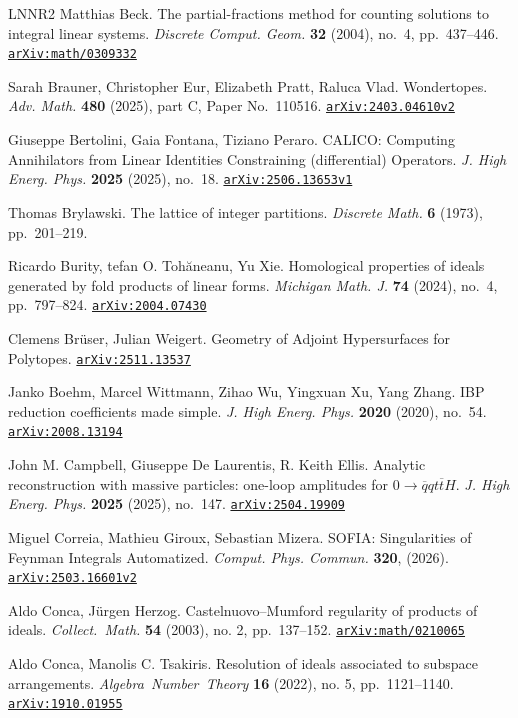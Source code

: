 \documentclass [a4paper,reqno, 11pt]{amsart}
\theoremstyle{plain}
\theoremstyle{plain}
\theoremstyle{plain}
\theoremstyle{plain}
\theoremstyle{definition}
\theoremstyle{definition}
\theoremstyle{definition}
\theoremstyle{definition}
\theoremstyle{definition}
\theoremstyle{definition}
\newcommand{\arxiv}[1]{\href{http://arxiv.org/abs/#1}{{\tt arXiv:#1}}}
\begin{document}
\begin{thebibliography}{LNNR2}
Matthias Beck. The partial-fractions method for counting solutions to integral linear systems. \textit{Discrete Comput. Geom.} \textbf{32} (2004), no.~4, pp.~437--446. \arxiv{math/0309332}

Sarah Brauner, Christopher Eur, Elizabeth Pratt, Raluca Vlad. Wondertopes. \textit{Adv. Math.} \textbf{480} (2025), part C, Paper No.~110516. \arxiv{2403.04610v2}

Giuseppe Bertolini, Gaia Fontana, Tiziano Peraro. CALICO: Computing Annihilators from Linear Identities Constraining (differential) Operators. \textit{J. High Energ. Phys.} \textbf{2025} (2025), no.~18. \arxiv{2506.13653v1}

Thomas Brylawski. The lattice of integer partitions. \textit{Discrete Math.} \textbf{6} (1973), pp.~201--219.

Ricardo Burity, tefan O. Toh\u{a}neanu, Yu Xie. Homological properties of ideals generated by fold products of linear forms. \textit{Michigan Math. J.} \textbf{74} (2024), no.~4, pp.~797--824. \arxiv{2004.07430}

Clemens Br\"user, Julian Weigert. Geometry of Adjoint Hypersurfaces for Polytopes. \arxiv{2511.13537} 

Janko Boehm, Marcel Wittmann, Zihao Wu, Yingxuan Xu, Yang Zhang. IBP reduction coefficients made simple. \textit{J. High Energ. Phys.} \textbf{2020} (2020), no.~54. \arxiv{2008.13194}

John M. Campbell, Giuseppe De Laurentis, R. Keith Ellis. Analytic reconstruction with massive particles: one-loop amplitudes for $0\rightarrow \overline{q}qt\overline{t}H$. \textit{J. High Energ. Phys.} \textbf{2025} (2025), no.~147. \arxiv{2504.19909}

Miguel Correia, Mathieu Giroux, Sebastian Mizera. SOFIA: Singularities of Feynman Integrals Automatized. \textit{Comput. Phys. Commun.} \textbf{320}, (2026). \arxiv{2503.16601v2}

Aldo Conca, J\"urgen Herzog. Castelnuovo--Mumford regularity of products of ideals. \textit{Collect.\ Math.} \textbf{54} (2003), no. 2, pp.~137--152. \arxiv{math/0210065}

Aldo Conca, Manolis C. Tsakiris. Resolution of ideals associated to subspace arrangements. \textit{Algebra\ Number\ Theory} \textbf{16} (2022), no. 5, pp.~1121--1140. \arxiv{1910.01955}


\end{thebibliography}
\end{document}
